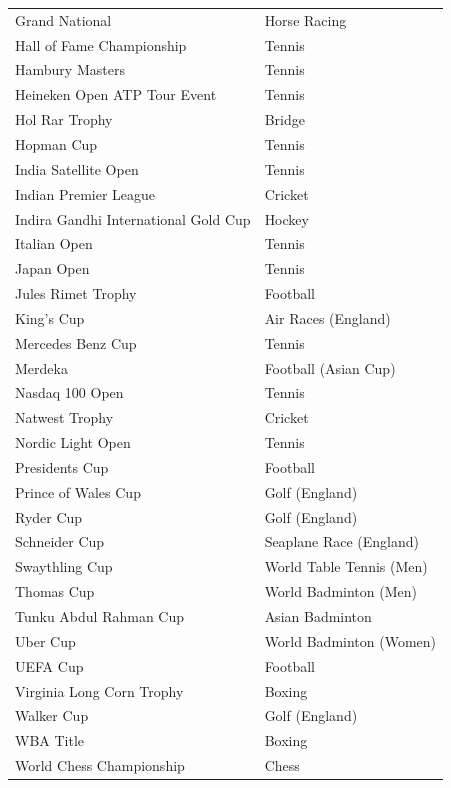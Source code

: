 \documentclass[
  openany]{book}
\begin{document}
\begin{longtable}[t]{ll}
\addlinespace
Grand National & Horse Racing\\
\rowcolor{gray!6}  Hall of Fame Championship & Tennis\\
Hambury Masters & Tennis\\
\rowcolor{gray!6}  Heineken Open ATP Tour Event & Tennis\\
Hol Rar Trophy & Bridge\\
\addlinespace
\rowcolor{gray!6}  Hopman Cup & Tennis\\
India Satellite Open & Tennis\\
\rowcolor{gray!6}  Indian Premier League & Cricket\\
Indira Gandhi International Gold Cup & Hockey\\
\rowcolor{gray!6}  Italian Open & Tennis\\
\addlinespace
Japan Open & Tennis\\
\rowcolor{gray!6}  Jules Rimet Trophy & Football\\
King's Cup & Air Races (England)\\
\rowcolor{gray!6}  Mercedes Benz Cup & Tennis\\
Merdeka & Football (Asian Cup)\\
\addlinespace
\rowcolor{gray!6}  Nasdaq 100 Open & Tennis\\
Natwest Trophy & Cricket\\
\rowcolor{gray!6}  Nordic Light Open & Tennis\\
Presidents Cup & Football\\
\rowcolor{gray!6}  Prince of Wales Cup & Golf (England)\\
\addlinespace
Ryder Cup & Golf (England)\\
\rowcolor{gray!6}  Schneider Cup & Seaplane Race (England)\\
Swaythling Cup & World Table Tennis (Men)\\
\rowcolor{gray!6}  Thomas Cup & World Badminton (Men)\\
Tunku Abdul Rahman Cup & Asian Badminton\\
\addlinespace
\rowcolor{gray!6}  Uber Cup & World Badminton (Women)\\
UEFA Cup & Football\\
\rowcolor{gray!6}  Virginia Long Corn Trophy & Boxing\\
Walker Cup & Golf (England)\\
\rowcolor{gray!6}  WBA Title & Boxing\\
\addlinespace
World Chess Championship & Chess\\
\bottomrule
\end{longtable}
\end{document}
